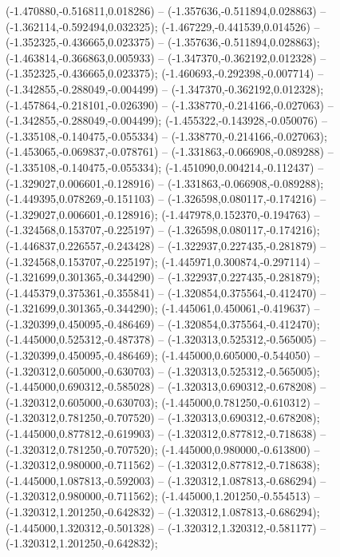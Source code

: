  (-1.470880,-0.516811,0.018286) -- (-1.357636,-0.511894,0.028863) -- (-1.362114,-0.592494,0.032325);
 (-1.467229,-0.441539,0.014526) -- (-1.352325,-0.436665,0.023375) -- (-1.357636,-0.511894,0.028863);
 (-1.463814,-0.366863,0.005933) -- (-1.347370,-0.362192,0.012328) -- (-1.352325,-0.436665,0.023375);
 (-1.460693,-0.292398,-0.007714) -- (-1.342855,-0.288049,-0.004499) -- (-1.347370,-0.362192,0.012328);
 (-1.457864,-0.218101,-0.026390) -- (-1.338770,-0.214166,-0.027063) -- (-1.342855,-0.288049,-0.004499);
 (-1.455322,-0.143928,-0.050076) -- (-1.335108,-0.140475,-0.055334) -- (-1.338770,-0.214166,-0.027063);
 (-1.453065,-0.069837,-0.078761) -- (-1.331863,-0.066908,-0.089288) -- (-1.335108,-0.140475,-0.055334);
 (-1.451090,0.004214,-0.112437) -- (-1.329027,0.006601,-0.128916) -- (-1.331863,-0.066908,-0.089288);
 (-1.449395,0.078269,-0.151103) -- (-1.326598,0.080117,-0.174216) -- (-1.329027,0.006601,-0.128916);
 (-1.447978,0.152370,-0.194763) -- (-1.324568,0.153707,-0.225197) -- (-1.326598,0.080117,-0.174216);
 (-1.446837,0.226557,-0.243428) -- (-1.322937,0.227435,-0.281879) -- (-1.324568,0.153707,-0.225197);
 (-1.445971,0.300874,-0.297114) -- (-1.321699,0.301365,-0.344290) -- (-1.322937,0.227435,-0.281879);
 (-1.445379,0.375361,-0.355841) -- (-1.320854,0.375564,-0.412470) -- (-1.321699,0.301365,-0.344290);
 (-1.445061,0.450061,-0.419637) -- (-1.320399,0.450095,-0.486469) -- (-1.320854,0.375564,-0.412470);
 (-1.445000,0.525312,-0.487378) -- (-1.320313,0.525312,-0.565005) -- (-1.320399,0.450095,-0.486469);
 (-1.445000,0.605000,-0.544050) -- (-1.320312,0.605000,-0.630703) -- (-1.320313,0.525312,-0.565005);
 (-1.445000,0.690312,-0.585028) -- (-1.320313,0.690312,-0.678208) -- (-1.320312,0.605000,-0.630703);
 (-1.445000,0.781250,-0.610312) -- (-1.320312,0.781250,-0.707520) -- (-1.320313,0.690312,-0.678208);
 (-1.445000,0.877812,-0.619903) -- (-1.320312,0.877812,-0.718638) -- (-1.320312,0.781250,-0.707520);
 (-1.445000,0.980000,-0.613800) -- (-1.320312,0.980000,-0.711562) -- (-1.320312,0.877812,-0.718638);
 (-1.445000,1.087813,-0.592003) -- (-1.320312,1.087813,-0.686294) -- (-1.320312,0.980000,-0.711562);
 (-1.445000,1.201250,-0.554513) -- (-1.320312,1.201250,-0.642832) -- (-1.320312,1.087813,-0.686294);
 (-1.445000,1.320312,-0.501328) -- (-1.320312,1.320312,-0.581177) -- (-1.320312,1.201250,-0.642832);
